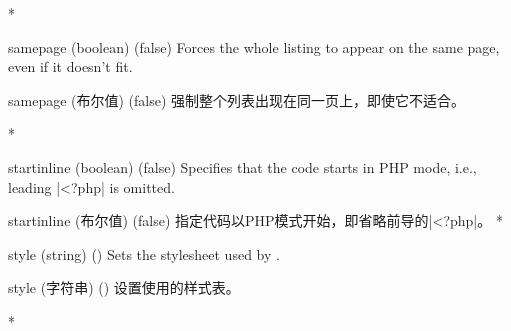 \begin{optionlist}
\begin{paracol}{2}
\switchcolumn[0]*%
  \item[samepage (boolean) (false)]
    Forces the whole listing to appear on the same page, even if it doesn't fit.
    \switchcolumn
    \item[samepage (布尔值) (false)]
    强制整个列表出现在同一页上，即使它不适合。

\switchcolumn[0]*%

  \item[startinline (boolean) (false)] 
    Specifies that the code starts in PHP mode, i.e., leading |<?php| is omitted.
    \switchcolumn
    \item[startinline (布尔值) (false)] 
    指定代码以PHP模式开始，即省略前导的|<?php|。
\switchcolumn[0]*%
  \item[style] (string) ()
    Sets the stylesheet used by .
    \switchcolumn
    \item[style] (字符串) ()
    设置使用的样式表。


\switchcolumn[0]*%
\end{paracol}
\end{optionlist}



